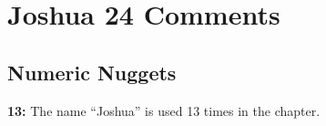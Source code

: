 \section{Joshua 24 Comments}

\subsection{Numeric Nuggets}
\textbf{13: } The name ``Joshua'' is used 13 times in the chapter.